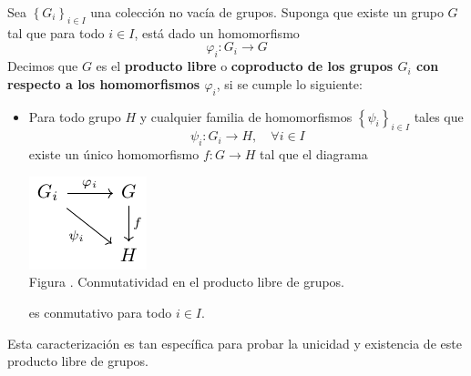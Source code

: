 \documentclass[12pt]{report}
\theoremstyle{largebreak}
\newcommand\cf[3]{\ensuremath{#1:#2\rightarrow#3}}
\newcounter{figcount}
\begin{document}
    \begin{mydef}
        Sea $\left\{G_i \right\}_{ i\in I}$ una colección no vacía de grupos. Suponga que existe un grupo $G$ tal que para todo $i\in I$, está dado un homomorfismo
        \begin{equation*}
            \cf{\varphi_i}{G_i}{G}
        \end{equation*}
        Decimos que $G$ es el \textbf{producto libre} o \textbf{coproducto de los grupos $G_i$ con respecto a los homomorfismos $\varphi_i$}, si se cumple lo siguiente:
        
        \begin{itemize}
            \item Para todo grupo $H$ y cualquier familia de homomorfismos $\left\{\psi_i \right\}_{ i\in I}$ tales que
            \begin{equation*}
                \cf{\psi_i}{G_i}{H},\quad\forall i\in I
            \end{equation*}
            existe un único homomorfismo $\cf{f}{G}{H}$ tal que el diagrama
    
            \begin{minipage}{\textwidth}
                \begin{center}
                    \includegraphics[scale=1.5]{images/fig_10.pdf}\\
                    Figura \thefigcount. Conmutatividad en el producto libre de grupos.
                \end{center}
            \end{minipage}
    
            es conmutativo para todo $i\in I$.
        \end{itemize}
    \end{mydef}

    Esta caracterización es tan específica para probar la unicidad y existencia de este producto libre de grupos.
\end{document}
